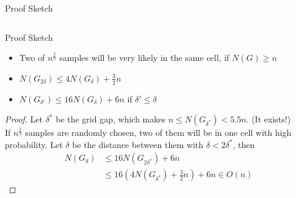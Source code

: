 \documentclass[18pt]{beamer}
\begin{document}
\begin{frame}{Proof Sketch}
\begin{columns}

\end{columns}

\end{frame}

\begin{frame}{Proof Sketch}
\begin{itemize}
\item Two of $n^{\frac{2}{3}}$ samples will be very likely in the same cell, if $N(G) \geq n$ 
\item $N(G_{2\delta}) \leq 4N(G_\delta) + \frac{3}{2}n$
\item $N(G_{\delta'}) \leq 16N(G_\delta) + 6n$ \hspace{2em} if $\delta' \leq \delta$
\end{itemize}

\begin{proof}
Let $\delta^*$ be the grid gap, which makes $n \leq N(G_{\delta^*}) < 5.5n$. (It exists!) \\
If $n^{\frac{2}{3}}$ samples are randomly chosen, two of them will be in one cell with high probability. Let $\delta$ be the distance between them with $\delta < 2\delta^*$, then
\begin{align*}
N(G_{\delta})  &\leq 16N(G_{2\delta^*}) + 6n \\
               &\leq 16(4N(G_{\delta^*})+\frac{3}{2}n)+6n \in O(n)
\end{align*}
 
\end{proof}

\end{frame}
\backupend
\end{document}

